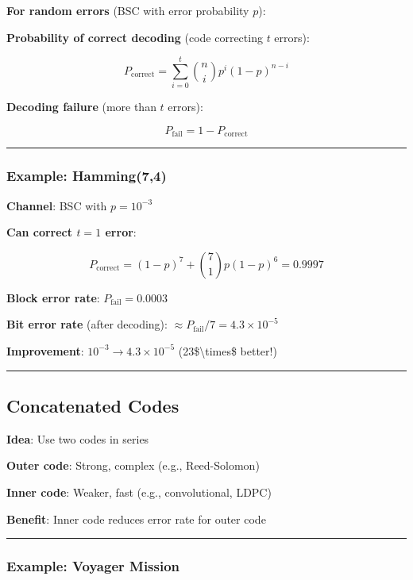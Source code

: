 \textbf{For random errors} (BSC with error probability \(p\)):

\textbf{Probability of correct decoding} (code correcting \(t\) errors):

\[
P_{\text{correct}} = \sum_{i=0}^{t} \binom{n}{i} p^i (1-p)^{n-i}
\]

\textbf{Decoding failure} (more than \(t\) errors):

\[
P_{\text{fail}} = 1 - P_{\text{correct}}
\]

\begin{center}\rule{0.5\linewidth}{0.5pt}\end{center}

\subsubsection{Example: Hamming(7,4)}\label{example-hamming74}

\textbf{Channel}: BSC with \(p = 10^{-3}\)

\textbf{Can correct \(t = 1\) error}:

\[
P_{\text{correct}} = (1-p)^7 + \binom{7}{1} p (1-p)^6 = 0.9997
\]

\textbf{Block error rate}: \(P_{\text{fail}} = 0.0003\)

\textbf{Bit error rate} (after decoding):
\(\approx P_{\text{fail}}/7 = 4.3 \times 10^{-5}\)

\textbf{Improvement}: \(10^{-3} \to 4.3 \times 10^{-5}\)
(23\$\textbackslash times\$ better!)

\begin{center}\rule{0.5\linewidth}{0.5pt}\end{center}

\subsection{Concatenated Codes}\label{concatenated-codes}

\textbf{Idea}: Use two codes in series

\textbf{Outer code}: Strong, complex (e.g., Reed-Solomon)

\textbf{Inner code}: Weaker, fast (e.g., convolutional, LDPC)

\textbf{Benefit}: Inner code reduces error rate for outer code

\begin{center}\rule{0.5\linewidth}{0.5pt}\end{center}

\subsubsection{Example: Voyager Mission}\label{example-voyager-mission}

